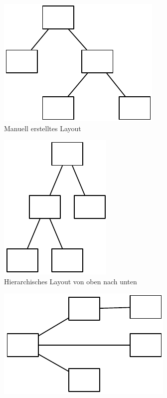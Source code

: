 \begin{figure}[hbt]
    \newcommand{\subfigureshortwidth}{0.28\textwidth}
    \newcommand{\subfigurelongwidth}{0.40\textwidth}
    \newcommand{\graphicsscale}{0.7}
    \centering
    \begin{subfigure}{\subfigureshortwidth}
        \centering
        \includegraphics[scale=\graphicsscale]{resources/omnigraffle-automatic-layout-a}
        \caption{Manuell erstelltes Layout}
        \label{fig:omnigraffle-automatic-layout-a}
    \end{subfigure}
    \begin{subfigure}{\subfigureshortwidth}
        \centering
        \includegraphics[scale=\graphicsscale]{resources/omnigraffle-automatic-layout-b}
        \caption{Hierarchisches Layout von oben nach unten}
        \label{fig:omnigraffle-automatic-layout-b}
    \end{subfigure}
    \begin{subfigure}{\subfigureshortwidth}
        \centering
        \includegraphics[scale=\graphicsscale]{resources/omnigraffle-automatic-layout-c}

\end{subfigure}
\end{figure}
